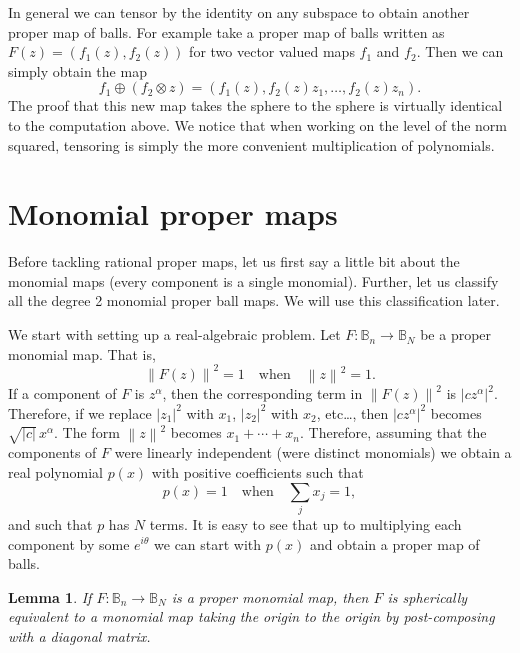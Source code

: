\documentclass[12pt,openany]{book}
\newcommand{\abs}[1]{\left\lvert {#1} \right\rvert}
\newcommand{\norm}[1]{\left\lVert {#1} \right\rVert}
\newcommand{\bB}{{\mathbb{B}}}
\newcommand{\sectionnewpage}{}
\theoremstyle{plain}
\newtheorem{lemma}[thm]{Lemma}
\theoremstyle{remark}
\theoremstyle{definition}
\theoremstyle{exercise}
\theoremstyle{example}
\begin{document}
In general we can tensor by the identity on any subspace to obtain another
proper map of balls.  For example take a proper map of balls written as
$F(z) = (f_1(z), f_2(z))$ for two vector valued maps $f_1$ and $f_2$.  Then
we can simply obtain the map
\begin{equation}
f_1 \oplus ( f_2 \otimes z ) = (f_1(z), f_2(z) z_1, \ldots, f_2(z) z_n) .
\end{equation}
The proof that this new map takes the sphere to the sphere is virtually
identical to the computation above.
We notice that when working on the level of the norm squared, tensoring is
simply the more convenient multiplication of polynomials.


\sectionnewpage
\section{Monomial proper maps}

Before tackling rational proper maps, let us first say a little bit about the
monomial maps (every component is a single monomial).  Further, let us
classify all the degree 2 monomial proper ball maps.  We will use this
classification later.

We start with setting up a real-algebraic problem.  Let
$F \colon \bB_n \to \bB_N$ be a proper monomial map.  That is,
\begin{equation}
\norm{F(z)}^2 = 1 \quad \text{when} \quad  \norm{z}^2  = 1.
\end{equation}
If a component of $F$ is $z^\alpha$, then
the corresponding term in $\norm{F(z)}^2$ is $\abs{c z^\alpha}^2$.
Therefore, if we replace
$\abs{z_1}^2$ with $x_1$,
$\abs{z_2}^2$ with $x_2$, etc\ldots,
then $\abs{c z^\alpha}^2$ becomes $\sqrt{\abs{c}}\,x^\alpha$.  The form
$\norm{z}^2$ becomes $x_1 + \cdots + x_n$.  Therefore, assuming that the
components of $F$ were linearly independent (were distinct monomials) we
obtain a real polynomial $p(x)$ with positive coefficients such that
\begin{equation}
p(x) = 1 \quad \text{when} \quad  \sum_j x_j  = 1,
\end{equation}
and such that $p$ has $N$ terms.  It is easy to see that up to multiplying
each component by some
$e^{i\theta}$ we can start with $p(x)$ and obtain a proper
map of balls.

\begin{lemma}
If $F \colon \bB_n \to \bB_N$ is a proper monomial map, then
$F$ is spherically equivalent to a monomial map
taking the origin to the origin by post-composing with
a diagonal matrix.
\end{lemma}
\end{document}
